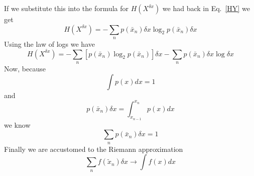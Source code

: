 \documentclass[12pt]{article}
\begin{document}
If we substitute this into the formula for $H(X^{\delta x})$ we had back in Eq.~\ref{HY} we get 
\begin{equation}
  H(X^{\delta x})=-\sum_n p(\bar{x}_n)\delta x \log_2{p(\bar{x}_n)\delta x}
\end{equation}
Using the law of logs we have
\begin{equation}
  H(X^{\delta x})=-\sum_n \left[p(\bar{x}_n) \log_2{p(\bar{x}_n)}\right] \delta x -\sum_np(\bar{x}_n)\delta x \log{\delta x}
\end{equation}
Now, because
\begin{equation}
  \int p(x)dx=1
\end{equation}
and 
\begin{equation}
  p(\bar{x}_n)\delta x=\int_{x_{n-1}}^{x_n}p(x)dx
\end{equation}
we know
\begin{equation}
  \sum_np(\bar{x}_n)\delta x=1     
\end{equation}
Finally we are accustomed to the Riemann approximation
\begin{equation}
  \sum_n f(\tilde{x}_n) \delta x\rightarrow \int f(x)dx
\end{equation}
\end{document}
